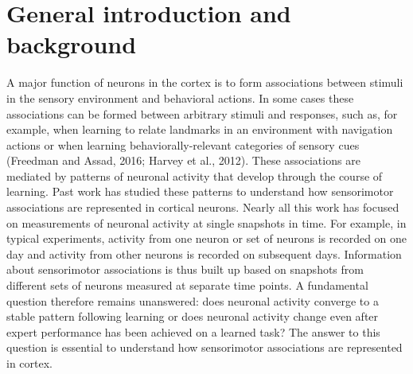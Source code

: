 \chapter{General introduction and background} \label{chapter_1}

A major function of neurons in the cortex is to form associations between stimuli in the sensory environment and behavioral actions. In some cases these associations can be formed between arbitrary stimuli and responses, such as, for example, when learning to relate landmarks in an environment with navigation actions or when learning behaviorally-relevant categories of sensory cues\citep{Harvey:2012du} (Freedman and Assad, 2016; Harvey et al., 2012). These associations are mediated by patterns of neuronal activity that develop through the course of learning. \citep{Abbott2009} Past work has studied these patterns to understand how sensorimotor associations are represented in cortical neurons. Nearly all this work has focused on measurements of neuronal activity at single snapshots in time. For example, in typical experiments, activity from one neuron or set of neurons is recorded on one day and activity from other neurons is recorded on subsequent days. Information about sensorimotor associations is thus built up based on snapshots from different sets of neurons measured at separate time points. A fundamental question therefore remains unanswered: does neuronal activity converge to a stable pattern following learning or does neuronal activity change even after expert performance has been achieved on a learned task? The answer to this question is essential to understand how sensorimotor associations are represented in cortex.

\bigskip

